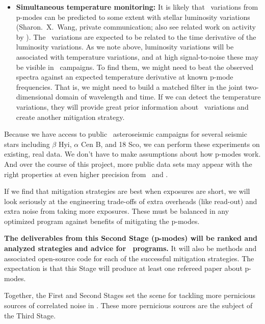 \documentclass[12pt, letterpaper]{article}
\begin{document}
\begin{itemize}
\item
\textbf{Simultaneous temperature monitoring:}
It is likely that \RV\ variations from p-modes can be predicted
to some extent with stellar luminosity variations
(Sharon.~X.~Wang, private communication; also see related work on activity by \citealt{Aigrain}).
The \RV\ variations are expected to be related to the time derivative of the
luminosity variations.
As we note above, luminosity variations will be associated with
temperature variations, and at high signal-to-noise these may be
visible in \EPRV\ campaigns.
To find them, we might need to beat the observed spectra against an
expected temperature derivative at known p-mode frequencies.
That is, we might need to build a matched filter in the joint
two-dimensional domain of wavelength and time.
If we can detect the temperature variations, they will provide great
prior information about \RV\ variations and create another mitigation
strategy.
\end{itemize}

\noindent
Because we have access to public \HARPS\ asteroseismic campaigns for 
several seismic stars including $\beta$ Hyi, $\alpha$ Cen B, and 18 Sco,
we can perform these experiments on existing, real data.
We don't have to make assumptions about how p-modes work.
And over the course of this project, more public data sets may appear
with the right properties at even higher precision from \ESPRESSO\ and \NEID.

If we find that mitigation strategies are best when exposures
are short, we will look seriously at the engineering trade-offs
of extra overheads (like read-out) and extra noise from taking
more exposures. These must be balanced in any optimized program
against benefits of mitigating the p-modes.

\textbf{The deliverables from this Second Stage (p-modes) will be ranked
and analyzed strategies and advice for \EPRV\ programs.} It will
also be methods and associated open-source code for each of the successful
mitigation strategies.
The expectation is that this Stage will produce at least one
refereed paper about p-modes. 

Together, the First and Second Stages set the scene for tackling more
pernicious sources of correlated noise in \EPRV.
These more pernicious sources are the subject of the Third Stage.

\end{document}
